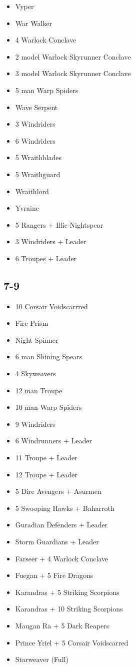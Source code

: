 \documentclass{HordeModeTarot}
\begin{document}
\begin{multicols}{2}
\begin{itemize}[leftmargin=*]
\item[] Vyper
\item[] War Walker
\item[] 4 Warlock Conclave
\item[] 2 model Warlock Skyrunner Conclave
\item[] 3 model Warlock Skyrunner Conclave
\item[] 5 man Warp Spiders
\item[] Wave Serpent
\item[] 3 Windriders
\item[] 6 Windriders
\item[] 5 Wraithblades
\item[] 5 Wraithguard
\item[] Wraithlord
\item[] Yvraine
\item[] 5 Rangers + Illic Nightspear
\item[] 3 Windriders + Leader
\item[] 6 Troupes + Leader
\end{itemize}

\subsection*{7-9}

\begin{itemize}[leftmargin=*]
\item[] 10 Corsair Voidscarrred
\item[] Fire Prism
\item[] Night Spinner
\item[] 6 man Shining Spears
\item[] 4 Skyweavers
\item[] 12 man Troupe
\item[] 10 man Warp Spiders
\item[] 9 Windriders
\item[] 6 Windrunners + Leader
\item[] 11 Troupe + Leader
\item[] 12 Troupe + Leader
\item[] 5 Dire Avengers + Asurmen
\item[] 5 Swooping Hawks + Baharroth
\item[] Guradian Defenders + Leader
\item[] Storm Guardians + Leader
\item[] Farseer + 4 Warlock Conclave
\item[] Fuegan + 5 Fire Dragons
\item[] Karandras + 5 Striking Scorpions
\item[] Karandras + 10 Striking Scorpions
\item[] Maugan Ra + 5 Dark Reapers
\item[] Prince Yriel + 5 Corsair Voidscarred
\item[] Starweaver (Full)
\end{itemize}


\end{multicols}
\end{document}
